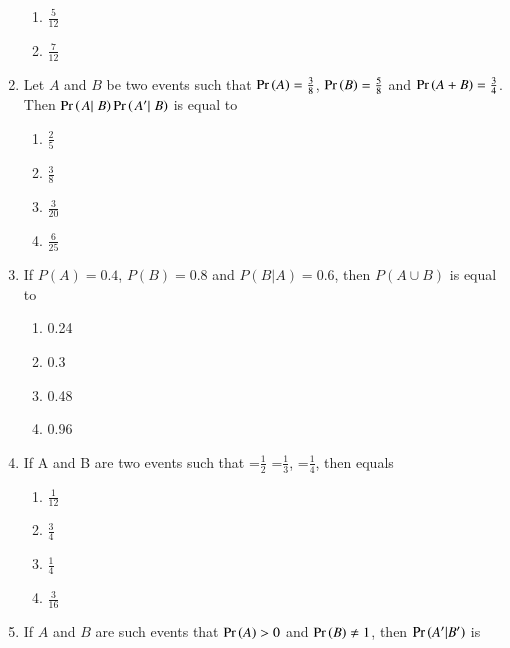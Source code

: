 \begin{enumerate}[label=\thesubsection.\arabic*,ref=\thesubsection.\theenumi]
\begin{multicols}{4}
\begin{enumerate}
	\item $\frac{5}{12}$
	\item $\frac{7}{12}$
\end{enumerate}
\end{multicols}
\solution

\item Let $A$ and $B$ be two  events such that $\Pr\left(A\right) = \frac{3}{8}$, $\Pr\left(B\right) = \frac{5}{8}$ and $\Pr\left(A+B\right) = \frac{3}{4}$. Then $\Pr\left(\left.{A}|\right.{B}\right)\Pr\left(\left.{A^\prime} |\right.{B}\right)$ is equal to
\begin{multicols}{4}
\begin{enumerate}
\item $\frac{2}{5}$
\vspace{3pt}
\item $\frac{3}{8}$
\vspace{3pt}
\item $\frac{3}{20}$
\vspace{3pt}
\item $\frac{6}{25}$
\end{enumerate}
\end{multicols}
\solution

\item If $P(A)=0.4$, $P(B)=0.8$ and $P(B|A)=0.6$, then $P(A \cup B)$ is equal to
\begin{multicols}{4}
\begin{enumerate}
\item 0.24
\item 0.3
\item 0.48
\item 0.96
\end{enumerate}
\end{multicols}
\solution

\item If A and B are two events such that  =$\frac{1}{2}$  =$\frac{1}{3}$, =$\frac{1}{4}$, then  equals
\begin{multicols}{4}
\begin{enumerate}
	\item $\frac{1}{12}$
	\item $\frac{3}{4}$
	\item $\frac{1}{4}$
	\item $\frac{3}{16}$	
\end{enumerate}
\end{multicols}
\solution

\item If $A$ and $B$ are such events that $\Pr\left(A\right) > 0$ and $\Pr\left(B\right)\neq 1$, then $\Pr\left(A^\prime|B^\prime\right)$ is

\end{enumerate}
